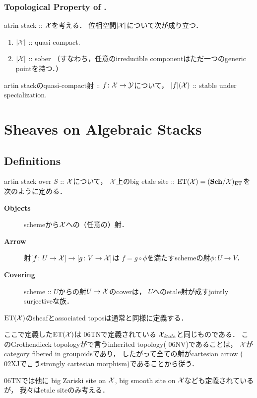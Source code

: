 \subsubsection{Topological Property of .}
\begin{Prop}
    atrin stack :: $\mathcal{X}$を考える．
    位相空間$|\mathcal{X}|$について次が成り立つ．
    \begin{enumerate}
        \item $|\mathcal{X}|$ :: quasi-compact.
        \item $|\mathcal{X}|$ :: sober
            （すなわち，任意のirreducible componentはただ一つのgeneric pointを持つ．）
    \end{enumerate}
\end{Prop}

\begin{Prop}
    artin stackのquasi-compact射 :: $f \colon \mathcal{X} \to \mathcal{Y}$について，
    $|f|(\mathcal{X})$ :: stable under specialization.
\end{Prop}

\section{Sheaves on Algebraic Stacks}

\subsection{Definitions}
\begin{Def}
    artin stack over $S$ :: $\mathcal{X}$について，
    $\mathcal{X}$上のbig etale site :: $\mathrm{ET}(\mathcal{X})=(\mathbf{Sch}/\mathcal{X})_{\mathrm{ET}}$を次のように定める．
    \begin{description}
        \item[\textbf{Objects}]
            schemeから$\mathcal{X}$への（任意の）射．

        \item[\textbf{Arrow}]
            射$[f \colon U \to \mathcal{X}] \to [g \colon V \to \mathcal{X}]$は
            $f=g \circ \phi$を満たすschemeの射$\phi \colon U \to V$．

        \item[\textbf{Covering}]
            scheme :: $U$からの射$U \to \mathcal{X}$のcoverは，
            $U$へのetale射が成すjointly surjectiveな族．
    \end{description}
    $\mathrm{ET}(\mathcal{X})$のsheafとassociated toposは通常と同様に定義する．
\end{Def}

\begin{Remark}
    ここで定義した$\mathrm{ET}(\mathcal{X})$は\cite{SP} 06TNで定義されている
    $\mathcal{X}_{\acute{e}tale}$と同じものである．
    このGrothendieck topologyが\cite{SP}で言うinherited topology(\cite{SP} 06NV)であることは，
    $\mathcal{X}$がcategory fibered in groupoidsであり，
    したがって全ての射がcartesian arrow
    (\cite{SP} 02XJで言うstrongly cartesian morphism)であることから従う．

    \cite{SP} 06TNでは他に
    big Zariski site on $\mathcal{X}$, big smooth site on $\mathcal{X}$なども定義されているが，
    我々はetale siteのみ考える．
\end{Remark}

